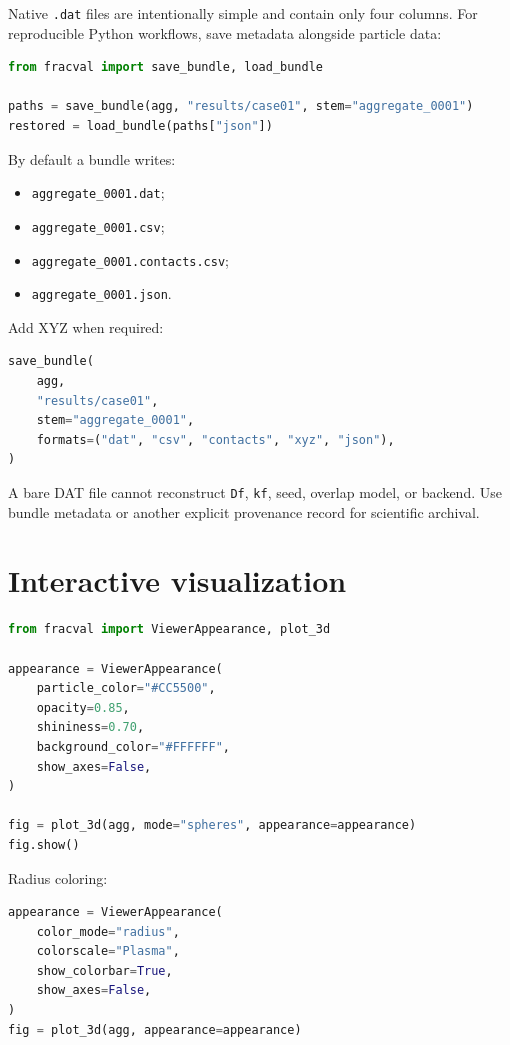 \documentclass[11pt,oneside]{report}
\newcommand{\code}[1]{\texttt{#1}}
\begin{document}
Native \code{.dat} files are intentionally simple and contain only four columns.
For reproducible Python workflows, save metadata alongside particle data:

\begin{lstlisting}[language=Python]
from fracval import save_bundle, load_bundle

paths = save_bundle(agg, "results/case01", stem="aggregate_0001")
restored = load_bundle(paths["json"])
\end{lstlisting}

By default a bundle writes:
\begin{itemize}
  \item \code{aggregate\_0001.dat};
  \item \code{aggregate\_0001.csv};
  \item \code{aggregate\_0001.contacts.csv};
  \item \code{aggregate\_0001.json}.
\end{itemize}

Add XYZ when required:

\begin{lstlisting}[language=Python]
save_bundle(
    agg,
    "results/case01",
    stem="aggregate_0001",
    formats=("dat", "csv", "contacts", "xyz", "json"),
)
\end{lstlisting}

\begin{warningbox}
A bare DAT file cannot reconstruct \code{Df}, \code{kf}, seed, overlap model,
or backend. Use bundle metadata or another explicit provenance record for
scientific archival.
\end{warningbox}

\section{Interactive visualization}

\begin{lstlisting}[language=Python]
from fracval import ViewerAppearance, plot_3d

appearance = ViewerAppearance(
    particle_color="#CC5500",
    opacity=0.85,
    shininess=0.70,
    background_color="#FFFFFF",
    show_axes=False,
)

fig = plot_3d(agg, mode="spheres", appearance=appearance)
fig.show()
\end{lstlisting}

Radius coloring:

\begin{lstlisting}[language=Python]
appearance = ViewerAppearance(
    color_mode="radius",
    colorscale="Plasma",
    show_colorbar=True,
    show_axes=False,
)
fig = plot_3d(agg, appearance=appearance)
\end{lstlisting}
\end{document}
